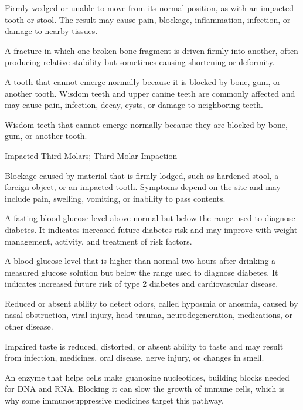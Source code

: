  Firmly wedged or unable to move from its normal position, as with an impacted tooth or stool. The result may cause pain, blockage, inflammation, infection, or damage to nearby tissues.

 A fracture in which one broken bone fragment is driven firmly into another, often producing relative stability but sometimes causing shortening or deformity.

 A tooth that cannot emerge normally because it is blocked by bone, gum, or another tooth. Wisdom teeth and upper canine teeth are commonly affected and may cause pain, infection, decay, cysts, or damage to neighboring teeth.

 Wisdom teeth that cannot emerge normally because they are blocked by bone, gum, or another tooth.

\synonyms
Impacted Third Molars; Third Molar Impaction

 Blockage caused by material that is firmly lodged, such as hardened stool, a foreign object, or an impacted tooth. Symptoms depend on the site and may include pain, swelling, vomiting, or inability to pass contents.

 A fasting blood-glucose level above normal but below the range used to diagnose diabetes. It indicates increased future diabetes risk and may improve with weight management, activity, and treatment of risk factors.

 A blood-glucose level that is higher than normal two hours after drinking a measured glucose solution but below the range used to diagnose diabetes. It indicates increased future risk of type 2 diabetes and cardiovascular disease.

 Reduced or absent ability to detect odors, called hyposmia or anosmia, caused by nasal obstruction, viral injury, head trauma, neurodegeneration, medications, or other disease.

 Impaired taste is reduced, distorted, or absent ability to taste and may result from infection, medicines, oral disease, nerve injury, or changes in smell.

 An enzyme that helps cells make guanosine nucleotides, building blocks needed for DNA and RNA. Blocking it can slow the growth of immune cells, which is why some immunosuppressive medicines target this pathway.

